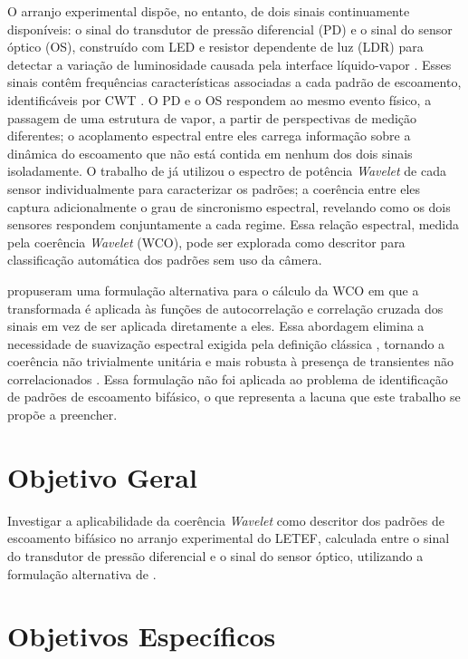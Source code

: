 O arranjo experimental dispõe, no entanto, de dois sinais continuamente disponíveis: o
sinal do transdutor de pressão diferencial (PD) e o sinal do sensor óptico (OS),
construído com LED e resistor dependente de luz (LDR) para detectar a variação de
luminosidade causada pela interface líquido-vapor \cite{deoliveira2021}. Esses sinais
contêm frequências características associadas a cada padrão de escoamento, identificáveis
por CWT \cite{deoliveira2021}. O PD e o OS respondem ao mesmo evento físico, a passagem
de uma estrutura de vapor, a partir de perspectivas de medição diferentes; o acoplamento
espectral entre eles carrega informação sobre a dinâmica do escoamento que não está
contida em nenhum dos dois sinais isoladamente. O trabalho de  
já utilizou o espectro de potência \textit{Wavelet} de cada sensor individualmente para caracterizar 
os padrões; a coerência entre eles captura adicionalmente o grau de sincronismo espectral, revelando 
como os dois sensores respondem conjuntamente a cada regime. Essa relação espectral, medida pela
coerência \textit{Wavelet} (WCO), pode ser explorada como descritor para classificação
automática dos padrões sem uso da câmera.

 propuseram uma formulação alternativa para o cálculo da WCO em
que a transformada é aplicada às funções de autocorrelação e correlação cruzada dos sinais
em vez de ser aplicada diretamente a eles. Essa abordagem elimina a necessidade de
suavização espectral exigida pela definição clássica \cite{torrence1998}, tornando a
coerência não trivialmente unitária e mais robusta à presença de transientes não
correlacionados \cite{schuck2019}. Essa formulação não foi aplicada ao problema de
identificação de padrões de escoamento bifásico, o que representa a lacuna que este
trabalho se propõe a preencher.

\section{Objetivo Geral}

Investigar a aplicabilidade da coerência \textit{Wavelet} como descritor dos padrões de
escoamento bifásico no arranjo
experimental do LETEF, calculada entre o sinal
do transdutor de pressão diferencial e o sinal do sensor óptico, utilizando a formulação
alternativa de .

\section{Objetivos Específicos}


